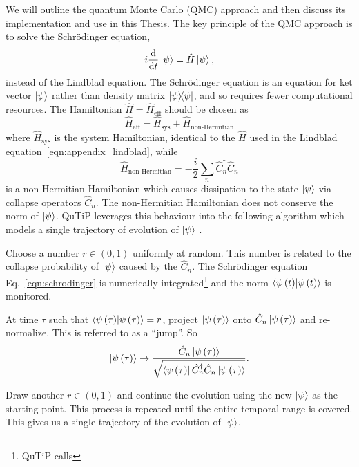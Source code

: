 We will outline the quantum Monte Carlo (QMC) approach and then discuss its implementation and use in this Thesis. The key principle of the QMC approach is to solve the Schr{\"o}dinger equation,
\begin{equation}\label{eqn:schrodinger}
i \frac{\mathrm{d}}{\mathrm{d}t} \ket{\psi} = \hat{H}\ket{\psi},
\end{equation}
instead of the Lindblad equation. The Schr{\"o}dinger equation is an equation for ket vector $\ket{\psi}$ rather than density matrix $\dyad{\psi}$, and so requires fewer computational resources. The Hamiltonian $\hat{H} = \hat{H}_{\text{eff}}$ should be chosen as
\begin{equation}
\hat{H}_{\text{eff}} = \hat{H}_{\text{sys}} + \hat{H}_{\text{non-Hermitian}}
\end{equation}
where $\hat{H}_{\text{sys}}$ is the system Hamiltonian, identical to the $\hat{H}$ used in the Lindblad equation~\ref{eqn:appendix_lindblad}, while 
\begin{equation}
\hat{H}_{\text{non-Hermitian}} = -\frac{i}{2} \sum_n \hat{C}_n^\dagger \hat{C}_n
\end{equation}
is a non-Hermitian Hamiltonian which causes dissipation to the state $\ket{\psi}$ via collapse operators $\hat{C}_n$. The non-Hermitian Hamiltonian does not conserve the norm of $\ket{\psi}$. QuTiP leverages this behaviour into the following algorithm which models a single trajectory of evolution of $\ket{\psi}$ \cite{Plenio1998, Dum1992, Dalibard1992, Daley2014}.

Choose a number $r \in \left(0, 1\right)$ uniformly at random. This number is related to the collapse probability of $\ket{\psi}$ caused by the $\hat{C}_n$. The Schr{\"o}dinger equation Eq.~\ref{eqn:schrodinger} is numerically integrated\footnote{QuTiP calls } and the norm $\ip{\psi\left(t\right)}$ is monitored.  

At time $\tau$ such that $\ip{\psi\left(\tau\right)} = r$, project $\ket{\psi\left(\tau\right)}$ onto $\hat{C}_n \ket{\psi\left(\tau\right)}$ and re-normalize. This is referred to as a ``jump''. So
\begin{equation}\label{eqn:appendix_jump}
\ket{\psi\left(\tau\right)} \rightarrow \frac{\hat{C}_n \ket{\psi\left(\tau\right)}}{\sqrt{\bra{\psi\left(\tau\right)}\hat{C}_n^\dagger \hat{C}_n \ket{\psi\left(\tau\right)}}}.
\end{equation}

\noindent Draw another $r \in \left(0, 1\right)$ and continue the evolution using the new $\ket{\psi}$ as the starting point. This process is repeated until the entire temporal range is covered. This gives us a single trajectory of the evolution of $\ket{\psi}$. 

